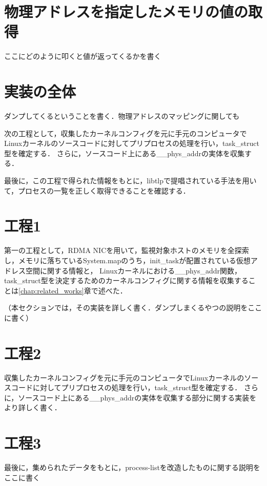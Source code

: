 \section{物理アドレスを指定したメモリの値の取得}

ここにどのように叩くと値が返ってくるかを書く

\section{実装の全体}

ダンプしてくるということを書く．物理アドレスのマッピングに関しても

次の工程として，収集したカーネルコンフィグを元に手元のコンピュータでLinuxカーネルのソースコードに対してプリプロセスの処理を行い，task_struct型を確定する．
さらに，ソースコード上にある__phys_addrの実体を収集する．

最後に，この工程で得られた情報をもとに，libtlpで提唱されている手法を用いて，プロセスの一覧を正しく取得できることを確認する．

\section{工程1}

第一の工程として，RDMA NICを用いて，監視対象ホストのメモリを全探索し，メモリに落ちているSystem.mapのうち，init_taskが配置されている仮想アドレス空間に関する情報と，
Linuxカーネルにおける__phys_addr関数，task_struct型を決定するためのカーネルコンフィグに関する情報を収集することは\ref{chap:related_works}章で述べた．

（本セクションでは，その実装を詳しく書く．ダンプしまくるやつの説明をここに書く）

\section{工程2}

収集したカーネルコンフィグを元に手元のコンピュータでLinuxカーネルのソースコードに対してプリプロセスの処理を行い，task_struct型を確定する．
さらに，ソースコード上にある__phys_addrの実体を収集する部分に関する実装をより詳しく書く．

\section{工程3}

最後に，集められたデータをもとに，process-listを改造したものに関する説明をここに書く
